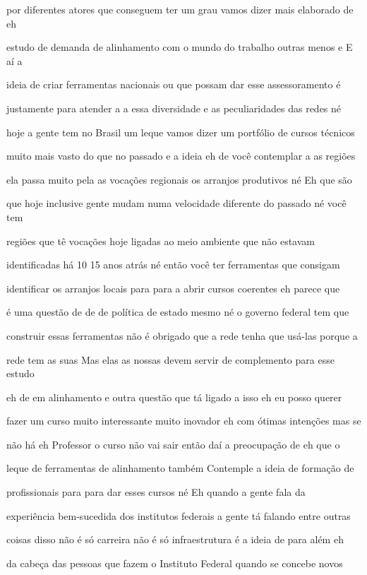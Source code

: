 \documentclass[a4paper,12pt]{article}
\begin{document}
por diferentes atores que conseguem ter um grau vamos dizer mais elaborado de eh

estudo de demanda de alinhamento com o mundo do trabalho outras menos e E aí a

ideia de criar ferramentas nacionais ou que possam dar esse assessoramento é

justamente para atender a a essa diversidade e as peculiaridades das redes né

hoje a gente tem no Brasil um leque vamos dizer um portfólio de cursos técnicos

muito mais vasto do que no passado e a ideia eh de você contemplar a as regiões

ela passa muito pela as vocações regionais os arranjos produtivos né Eh que são

que hoje inclusive gente mudam numa velocidade diferente do passado né você tem

regiões que tê vocações hoje ligadas ao meio ambiente que não estavam

identificadas há 10 15 anos atrás né então você ter ferramentas que consigam

identificar os arranjos locais para para a abrir cursos coerentes eh parece que

é uma questão de de de política de estado mesmo né o governo federal tem que

construir essas ferramentas não é obrigado que a rede tenha que usá-las porque a

rede tem as suas Mas elas as nossas devem servir de complemento para esse estudo

eh de em alinhamento e outra questão que tá ligado a isso eh eu posso querer

fazer um curso muito interessante muito inovador eh com ótimas intenções mas se

não há eh Professor o curso não vai sair então daí a preocupação de eh que o

leque de ferramentas de alinhamento também Contemple a ideia de formação de

profissionais para para dar esses cursos né Eh quando a gente fala da

experiência bem-sucedida dos institutos federais a gente tá falando entre outras

coisas disso não é só carreira não é só infraestrutura é a ideia de para além eh

da cabeça das pessoas que fazem o Instituto Federal quando se concebe novos
\end{document}
